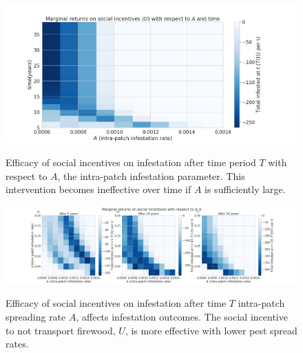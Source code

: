 \begin{figure}[!h]
\includegraphics[width=\textwidth]{chapter_2/A_v_time.png}
\caption[Efficacy of social incentives on infestation after time period $T$ with respect to $A$, the intra-patch infestation parameter.]{Efficacy of social incentives on infestation after time period $T$ with respect to $A$, the intra-patch infestation parameter. This intervention becomes ineffective over time if $A$ is sufficiently large.}
\protect \label{A_v_time}
\end{figure}




\begin{figure}[!h]
\includegraphics[width = \textwidth]{chapter_2/A_v_ct_v_d_marginal_gain.png}
\caption[Efficacy of social incentives on infestation after time $T$ intra-patch spreading rate $A$, affects infestation outcomes.]{Efficacy of social incentives on infestation after time $T$ intra-patch spreading rate $A$, affects infestation outcomes. The social incentive to not transport firewood, $U$, is more effective with lower pest spread rates.}
\protect \label{A_v_d}
\end{figure}


